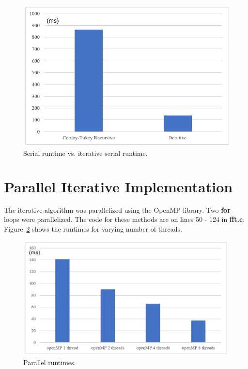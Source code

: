 \documentclass{amsart}
\begin{document}
\begin{figure}[htbp]
\caption{Serial runtime vs. iterative serial runtime.}
\begin{center}
\includegraphics{serial-vs-iterative-serial.PNG}
\end{center}
\label{figure:serial-vs-iterative-serial}
\end{figure}


\section{Parallel Iterative Implementation}
The iterative algorithm was parallelized using the OpenMP library. Two \textbf{for} loops were parallelized. The code for these methods are on lines 50 - 124 in \textbf{fft.c}. Figure~\ref{figure:parallel} shows the runtimes for varying number of threads.

\begin{figure}[H]
\caption{Parallel runtimes.}
\begin{center}
\includegraphics{parallel.PNG}
\end{center}
\label{figure:parallel}
\end{figure}
\end{document}
